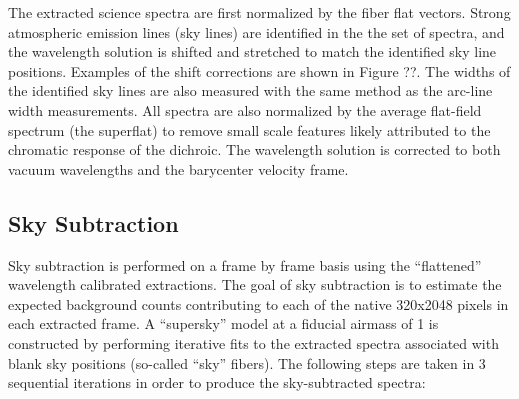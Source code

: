 \documentclass[12pt,preprint]{aastex}
\begin{document}
The extracted science spectra are first normalized by the fiber flat vectors.
Strong atmospheric emission lines (sky lines) are identified in the the 
set of spectra, and the wavelength solution is shifted and stretched 
to match the identified sky line positions.  
Examples of the shift corrections are shown in Figure ??.  
The widths of the identified sky lines are also measured with the same method
as the arc-line width measurements.  All spectra are also normalized by
the average flat-field spectrum (the superflat) to remove small scale
features likely attributed to the chromatic response of the dichroic.
The wavelength solution is corrected to both vacuum wavelengths and the
barycenter velocity frame.

\subsection{Sky Subtraction}

Sky subtraction is performed on a frame by frame basis using the 
``flattened'' wavelength calibrated extractions.  The goal of sky subtraction
is to estimate the expected background counts contributing to each of 
the native 320x2048 pixels in each extracted frame.  A ``supersky'' model 
at a fiducial airmass of 1 is constructed by performing iterative fits to
the extracted spectra associated with blank sky positions (so-called
``sky'' fibers).   The following steps are taken in 3 sequential iterations
in order to produce the sky-subtracted spectra:
\end{document}
